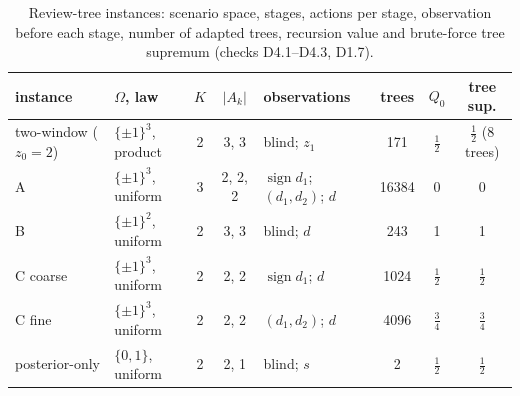 \documentclass[11pt,a4paper]{article}
\theoremstyle{plain}
\theoremstyle{definition}
\theoremstyle{remark}
\begin{document}
\begin{table}[H]
\centering\small
\caption{Review-tree instances: scenario space, stages, actions per stage, observation before each stage, number of adapted trees, recursion value and brute-force tree supremum (checks D4.1--D4.3, D1.7).}
\begin{tabular}{llcclccc}
\toprule
instance & $\Omega$, law & $K$ & $|A_k|$ & observations & trees & $Q_0$ & tree sup.\\
\midrule
two-window ($z_0=2$) & $\{\pm1\}^3$, product & 2 & 3, 3 & blind; $z_1$ & 171 & $\tfrac12$ & $\tfrac12$ (8 trees)\\
A & $\{\pm1\}^3$, uniform & 3 & 2, 2, 2 & $\operatorname{sign}d_1$; $(d_1,d_2)$; $d$ & 16384 & 0 & 0\\
B & $\{\pm1\}^2$, uniform & 2 & 3, 3 & blind; $d$ & 243 & 1 & 1\\
C coarse & $\{\pm1\}^3$, uniform & 2 & 2, 2 & $\operatorname{sign}d_1$; $d$ & 1024 & $\tfrac12$ & $\tfrac12$\\
C fine & $\{\pm1\}^3$, uniform & 2 & 2, 2 & $(d_1,d_2)$; $d$ & 4096 & $\tfrac34$ & $\tfrac34$\\
posterior-only & $\{0,1\}$, uniform & 2 & 2, 1 & blind; $s$ & 2 & $\tfrac12$ & $\tfrac12$\\
\bottomrule
\end{tabular}
\end{table}
\end{document}
